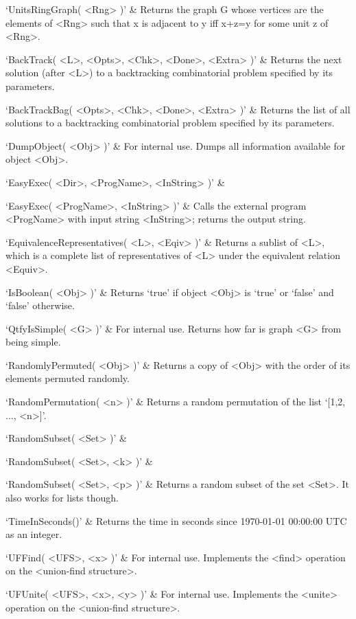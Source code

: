 `UnitsRingGraph( <Rng> )' & 
Returns  the graph G whose vertices are the elements of <Rng>  such that x
is adjacent to y iff x+z=y for some unit z of <Rng>.
\enditems


\beginitems
`BackTrack( <L>, <Opts>, <Chk>, <Done>, <Extra> )' & 
Returns the next solution (after <L>) to a backtracking combinatorial problem specified by its parameters.

`BackTrackBag( <Opts>, <Chk>, <Done>, <Extra> )' & 
Returns the list of all solutions to a backtracking combinatorial problem specified by its parameters.
\enditems


\beginitems
`DumpObject( <Obj> )' & 
For internal use. Dumps  all information available for object <Obj>.

`EasyExec( <Dir>, <ProgName>, <InString> )' & 

`EasyExec( <ProgName>, <InString> )' & 
Calls the external program <ProgName> with input string <InString>; returns the output string.

`EquivalenceRepresentatives( <L>, <Eqiv> )' &
Returns a sublist of <L>, which is a complete list of representatives of 
<L> under the equivalent relation <Equiv>.

`IsBoolean( <Obj> )' & 
Returns `true' if object <Obj> is `true' or `false' and `false' otherwise.

`QtfyIsSimple( <G> )' & 
For internal use. Returns how far is graph <G> from being simple.

`RandomlyPermuted( <Obj> )' & 
Returns  a copy of <Obj> with the order of its elements permuted randomly.

`RandomPermutation( <n> )' & 
Returns a random permutation of the list `[1,2, ..., <n>]'.

`RandomSubset( <Set> )' &

`RandomSubset( <Set>, <k> )' &

`RandomSubset( <Set>, <p> )' &
Returns a random subset of the set <Set>. It also works for lists though.

`TimeInSeconds()' & 
Returns the time in seconds since 1970-01-01 00:00:00 UTC as an integer.

`UFFind( <UFS>, <x> )' & 
For  internal  use.  Implements  the  <find>  operation on the <union-find structure>. 

`UFUnite( <UFS>, <x>, <y> )' & 
For  internal  use.  Implements  the  <unite> operation on the <union-find structure>.

